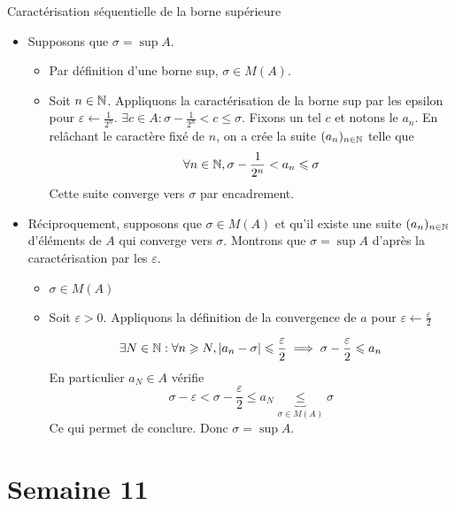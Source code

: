 \documentclass{article}
\renewenvironment{question_kholle}[2][ ]
{
	\subsection{\texorpdfstring{#2}{}}
	\notblank{#1}
	{
		\noindent #1
		\bigbreak
	}
	{}
	\begin{proof}
}
{
	\end{proof}
}
\begin{document}
\begin{question_kholle}[{Soit $A \in \mathcal{P}(\R)$ non vide et majorée. Soit $\sigma \in \R$
  $$
  \sigma = \sup A \iff \left\{ \begin{array}{ll}
    \sigma \in M(A)  \\
    \exists (a_{n})_{n \in \N} \in A^{\N} : \lim_{n \to +\infty} a_n = \sigma
  \end{array}\right.
  $$
  }]{Caractérisation séquentielle de la borne supérieure}
  \begin{itemize}[label=$\star$]
    \item Supposons que $\sigma = \sup A$.
    \begin{itemize}[label=$\bullet$]
      \item Par définition d'une borne sup, $\sigma \in M(A)$.
      \item Soit $n \in \mathbb N$. Appliquons la caractérisation de la borne sup par les epsilon pour $\varepsilon \leftarrow \frac{1}{2^{n}}$.
$\exists c \in A : \sigma - \frac{1}{2^{n}} < c \leqslant \sigma$.
      Fixons un tel $c$ et notons le $a_{n}$. En relâchant le caractère fixé de $n$, on a crée la suite $(a_{n})_{n \in \mathbb N}$ telle que
$$
      \forall n \in \mathbb N, \sigma - \frac{1}{2^{n}} < a_{n}\leqslant \sigma
$$
      Cette suite converge vers $\sigma$ par encadrement.
    \end{itemize}
    \item Réciproquement, supposons que $\sigma \in M(A)$ et qu'il existe une suite $(a_{n})_{n \in \mathbb N}$ d'éléments de $A$ qui converge vers $\sigma$. Montrons que $\sigma = \sup A$ d'après la caractérisation par les $\varepsilon$.
    \begin{itemize}[label=$\bullet$]
      \item$\sigma \in M(A)$
      \item Soit $\varepsilon>0$. Appliquons la définition de la convergence de $a$ pour $\varepsilon \leftarrow \frac{\varepsilon}{2}$
      
$$
      \exists N \in \mathbb N : \forall n \geqslant N, \lvert a_{n} - \sigma \rvert  \leqslant \frac{\varepsilon}{2} \implies \sigma - \frac{\varepsilon}{2}\leqslant a_{n}
$$
      En particulier $a_{N} \in A$ vérifie
$$
      \sigma - \varepsilon < \sigma - \frac{\varepsilon}{2} \leqslant a_{N} \underbrace{ \leqslant }_{ \sigma \in M(A) } \sigma
$$
      Ce qui permet de conclure.
      Donc $\sigma = \sup A$.
    \end{itemize}
  \end{itemize}
\end{question_kholle}
\pagebreak\section{Semaine 11}
\end{document}
